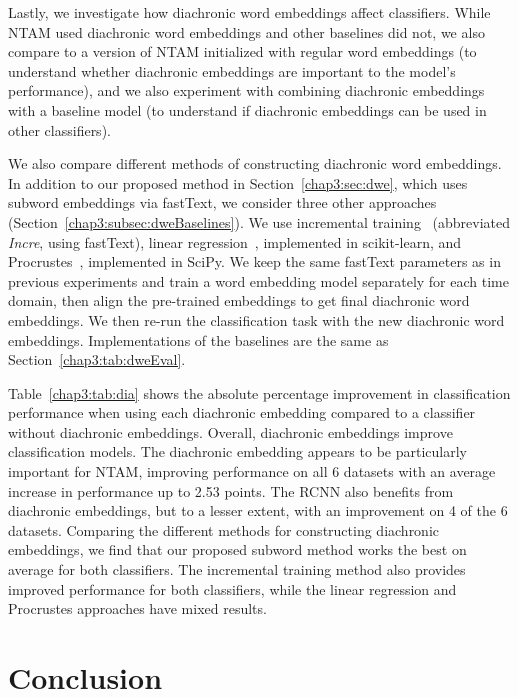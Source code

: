 Lastly, we investigate how diachronic word embeddings affect classifiers.
While NTAM used diachronic word embeddings and other baselines did not,
we also compare to a version of NTAM initialized with regular word embeddings (to understand whether diachronic embeddings are important to the model's performance),
and we also experiment with combining diachronic embeddings with a baseline model (to understand if diachronic embeddings can be used in other classifiers).


We also compare different methods of constructing diachronic word embeddings. In addition to our proposed method in Section~\ref{chap3:sec:dwe}, which uses subword embeddings via fastText,
we consider three other approaches (Section~\ref{chap3:subsec:dweBaselines}).
We use incremental training~\cite{kim2014temporal} (abbreviated \textit{Incre}, using fastText),
linear regression~\cite{kulkarni2015statistically}, implemented in scikit-learn,
and Procrustes~\cite{hamilton2016diachronic}, implemented in SciPy.
We keep the same fastText parameters as in previous experiments and train a word embedding model separately for each time domain, then align the pre-trained embeddings to get final diachronic word embeddings. 
We then re-run the classification task with the new diachronic word embeddings. 
Implementations of the baselines are the same as Section~\ref{chap3:tab:dweEval}.

Table~\ref{chap3:tab:dia} shows the absolute percentage improvement in classification performance when using each diachronic embedding compared to a classifier without diachronic embeddings.
Overall, diachronic embeddings improve classification models.
The diachronic embedding appears to be particularly important for NTAM, improving performance on all 6 datasets with an average increase in performance up to 2.53 points.
The RCNN also benefits from diachronic embeddings, but to a lesser extent, with an improvement on 4 of the 6 datasets.
Comparing the different methods for constructing diachronic embeddings,
we find that our proposed subword method works the best on average for both classifiers. The incremental training method also provides improved performance for both classifiers, while the linear regression and Procrustes approaches have mixed results.


\section{Conclusion}
\label{chap3:sec:conclusion}

